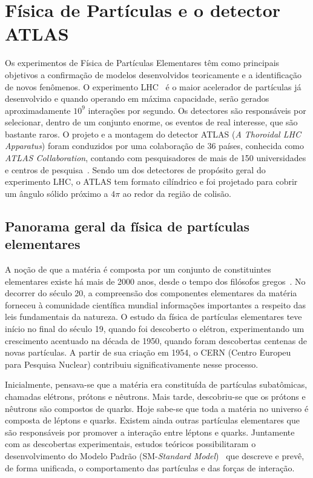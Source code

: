 


\chapter{Física de Partículas e o detector ATLAS}

Os experimentos de Física de Partículas Elementares têm como
principais objetivos a confirmação de modelos desenvolvidos
teoricamente e a identificação de novos fenômenos. O experimento
LHC~\cite{article:LHC:2008} é o maior acelerador de partículas já
desenvolvido e quando operando em máxima capacidade, serão gerados
aproximadamente $10^9$ interações por segundo. Os detectores são
responsáveis por selecionar, dentro de um conjunto enorme, os
eventos de real interesse, que são bastante raros. O projeto e a
montagem do detector ATLAS (\textit{A Thoroidal LHC Apparatus})
\cite{article:ATLAS:2008} foram conduzidos por uma cola\-bo\-ração
de 36 países, conhecida como \textit{ATLAS Collaboration}, contando
com pesquisadores de mais de 150 universidades e centros de
pesquisa~\cite{Homepage:ATLAS}. Sendo um dos detectores de propósito
geral do experimento LHC, o ATLAS tem formato cilíndrico e foi
projetado para cobrir um ângulo sólido próximo a $4\pi$ ao redor da
região de colisão.


\section{Panorama geral da física de partículas elementares}

A noção de que a matéria é composta por um conjunto de constituintes
elementares existe há mais de 2000 anos, desde o tempo dos filósofos
gregos~\cite{book:fernow:1986}. No decorrer do século 20, a
compreensão dos componentes elementares da matéria forneceu à
comunidade científica mundial informações importantes a res\-peito
das leis fundamentais da natureza. O estudo da física de partículas
elementares teve início no final do século 19, quando foi descoberto
o elétron, experimentando um crescimento acen\-tua\-do na década de
1950, quando foram descobertas centenas de novas partículas. A partir de sua criação 
em 1954, o CERN (Centro Europeu para Pesquisa Nuclear) contribuiu significativamente
nesse processo.

Inicialmente, pensava-se que a matéria era constituída de partículas
subatô\-micas, chamadas elétrons, prótons e nêutrons. Mais tarde,
descobriu-se que os prótons e nêutrons são compostos de quarks. Hoje
sabe-se que toda a matéria no universo é composta de léptons e
quarks. Existem ainda outras partículas elementares que são
responsáveis por promover a interação entre léptons e quarks.
Juntamente com as descobertas experimentais, estudos teóricos
possibilitaram o desenvolvimento do Modelo Padrão
(SM-\textit{Standard Model})~\cite{livro:fisica1:2006} que descreve
e prevê, de forma unificada, o comportamento das partículas e das
forças de interação.

